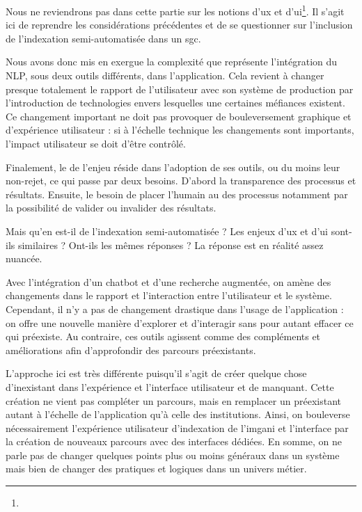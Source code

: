 
Nous ne reviendrons pas dans cette partie sur les notions d'\gls{ux} et d'\gls{ui}\footnote{}. Il s'agit ici de reprendre les considérations précédentes et de se questionner sur l'inclusion de l'indexation semi-automatisée dans un \gls{sgc}.\newline

Nous avons donc mis en exergue la complexité que représente l'intégration du \gls{NLP}, sous deux outils différents, dans l'application. Cela revient à changer presque totalement le rapport de l'utilisateur avec son système de production par l'introduction de technologies envers lesquelles une certaines méfiances existent. Ce changement important ne doit pas provoquer de bouleversement graphique et d'expérience utilisateur : si à l'échelle technique les changements sont importants, l'impact utilisateur se doit d'être contrôlé. 

Finalement, le \coeur de l'enjeu réside dans l'adoption de ses outils, ou du moins leur non-rejet, ce qui passe par deux besoins. D'abord la transparence des processus et résultats. Ensuite, le besoin de placer l'humain au \coeur des processus notamment par la possibilité de valider ou invalider des résultats. \newline

Mais qu'en est-il de l'indexation semi-automatisée ? Les enjeux d'\gls{ux} et d'\gls{ui} sont-ils similaires ? Ont-ils les mêmes réponses ? La réponse est en réalité assez nuancée. 

Avec l'intégration d'un \gls{chatbot} et d'une recherche augmentée, on amène des changements dans le rapport et l’interaction entre l'utilisateur et le système. Cependant, il n'y a pas de changement drastique dans l'usage de l'application : on offre une nouvelle manière d'explorer et d’interagir sans pour autant effacer ce qui préexiste. Au contraire, ces outils agissent comme des compléments et améliorations afin d'approfondir des parcours préexistants. 

L'approche ici est très différente puisqu'il s'agit de créer quelque chose d'inexistant dans l'expérience et l'interface utilisateur et de manquant. Cette création ne vient pas compléter un parcours, mais en remplacer un préexistant autant à l'échelle de l'application qu'à celle des institutions. Ainsi, on bouleverse nécessairement l'expérience utilisateur d'indexation de l'\gls{imgani} et l'interface par la création de nouveaux parcours avec des interfaces dédiées. En somme, on ne parle pas de changer quelques points plus ou moins généraux dans un système mais bien de changer des pratiques et logiques dans un univers métier. \newline

